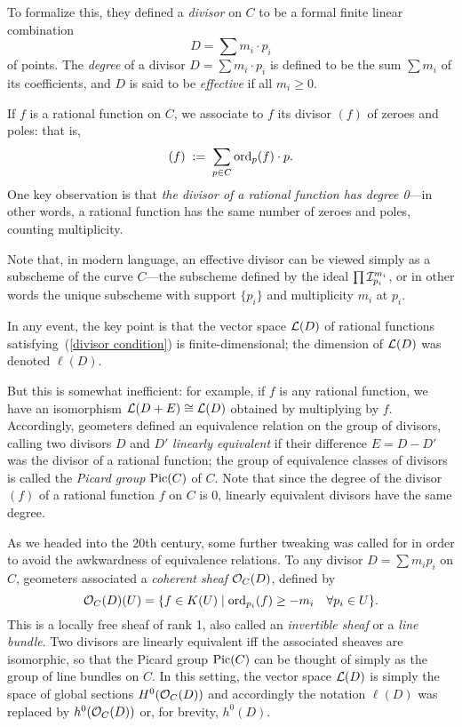 To formalize this, they defined a \emph{divisor} on $C$ to be a formal finite linear combination
$$
D = \sum m_i \cdot p_i
$$
of points. The \emph{degree} of a divisor $D = \sum m_i \cdot p_i$ is defined to be the sum $\sum m_i$ of its coefficients, and $D$ is said to be \emph{effective} if all $m_i \geq 0$. 

If $f$ is a rational function on $C$, we associate to $f$ its divisor $(f)$ of zeroes and poles: that is,
$$
(f) \; := \; \sum_{p \in C} \ord_p(f)\cdot p.
$$
One key observation is that \emph{the divisor of a rational function has degree 0}---in other words, a rational function has the same number of zeroes and poles, counting multiplicity. 

Note that, in modern language, an effective divisor can be viewed simply as a subscheme of the curve $C$---the subscheme defined by the ideal $\prod \cI_{p_i}^{m_i}$, or in other words the unique subscheme with support $\{p_i\}$ and multiplicity $m_i$ at $p_i$.

In any event, the key point is that  the vector space $\cL(D)$ of rational functions satisfying~(\ref{divisor condition}) is finite-dimensional; the dimension of $\cL(D)$ was denoted $\ell(D)$. 


But this is somewhat inefficient: for example, if $f$ is any rational function, we have an isomorphism $\cL(D+E) \cong \cL(D)$ obtained by multiplying by $f$. Accordingly, geometers defined an equivalence relation on the group of divisors, calling two divisors $D$ and $D'$ \emph{linearly equivalent} if their difference $E = D - D'$ was the divisor of a rational function; the group of equivalence classes of divisors is called the \emph{Picard group} $\Pic(C)$ of $C$. Note that since the degree of the divisor $(f)$ of a rational function $f$ on $C$ is 0, linearly equivalent divisors have the same degree.

As we headed into the 20th century, some further tweaking was called for in order to avoid the awkwardness of equivalence relations. To any divisor $D = \sum m_ip_i$ on $C$, geometers associated a \emph{coherent sheaf} $\cO_C(D)$, defined by
$$
\cO_C(D)(U) = \{ f \in K(U) \mid \ord_{p_i}(f) \geq -m_i \quad \forall p_i \in U \}.
$$
This is a locally free sheaf of rank 1, also called an \emph{invertible sheaf} or a \emph{line bundle}. Two divisors are linearly equivalent iff the associated sheaves are isomorphic, so that the Picard group $\Pic(C)$ can be thought of simply as the group of line bundles on $C$. In this setting, the vector space $\cL(D)$ is simply the space of global sections $H^0(\cO_C(D))$ and accordingly the notation $\ell(D)$ was replaced by $h^0(\cO_C(D))$ or, for brevity, $h^0(D)$. 

